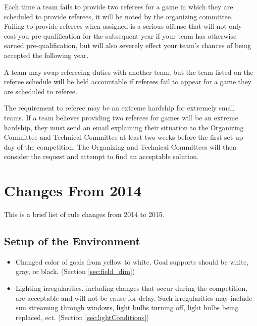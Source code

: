 \documentclass[12pt]{article}
\begin{document}
Each time a team fails to provide two referees for a game in which they are scheduled to provide referees, it will be noted by the organizing committee.  Failing to provide referees when assigned is a serious offense that will not only cost you pre-qualification for the subsequent year if your team has otherwise earned pre-qualification, but will also severely effect your team's chances of being accepted the following year.

A team may swap refereeing duties with another team, but the team listed on the referee schedule will be held accountable if referees fail to appear for a game they are scheduled to referee.

The requirement to referee may be an extreme hardship for extremely small teams.  If a team believes providing two referees for games will be an extreme hardship, they must send an email explaining their situation to the Organizing Committee and Technical Committee at least two weeks before the first set up day of the competition.  The Organizing and Technical Committees will then consider the request and attempt to find an acceptable solution.


\newpage


\section{Changes From 2014}
This is a brief list of rule changes from 2014 to 2015.

\subsection*{Setup of the Environment}
\begin{itemize}
	\item Changed color of goals from yellow to white. Goal supports should be white, gray, or black. (Section \ref{sec:field_dim})
	\item Lighting irregularities, including changes that occur during the competition, are acceptable and will not be cause for delay.  Such irregularities may include sun streaming through windows, light bulbs turning off, light bulbs being replaced, ect. (Section \ref{sec:lightConditions})
\end{itemize}
\end{document}
